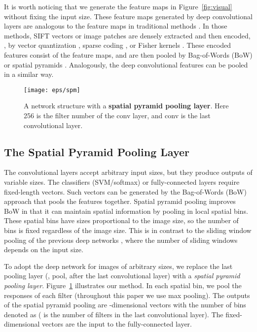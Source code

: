 \documentclass[10pt,journal,cspaper,compsoc]{IEEEtran}
\begin{document}
It is worth noticing that we generate the feature maps in Figure~\ref{fig:visual} without fixing the input size.
These feature maps generated by deep convolutional layers are analogous to the feature maps in traditional methods \cite{Chatfield2011,Coates2011}. In those methods, SIFT vectors \cite{Lowe2004} or image patches \cite{Coates2011} are densely extracted and then encoded, \eg, by vector quantization \cite{Sivic2003,Lazebnik2006,Gemert2008}, sparse coding \cite{Yang2009,Wang2010}, or Fisher kernels \cite{Perronnin2010}. These encoded features consist of the feature maps, and are then pooled by Bag-of-Words (BoW) \cite{Sivic2003} or spatial pyramids \cite{Grauman2005,Lazebnik2006}. Analogously, the deep convolutional features can be pooled in a similar way.

\begin{figure}[t]
\center
\texttt{[image: eps/spm]}
\caption{A network structure with a \textbf{spatial pyramid pooling layer}. Here 256 is the filter number of the conv layer, and conv is the last convolutional layer.}
\label{fig:spm}
\end{figure}

\subsection{The Spatial Pyramid Pooling Layer}

The convolutional layers accept arbitrary input sizes, but they produce outputs of variable sizes. The classifiers (SVM/softmax) or fully-connected layers require fixed-length vectors. Such vectors can be generated by the Bag-of-Words (BoW) approach \cite{Sivic2003} that pools the features together. Spatial pyramid pooling \cite{Grauman2005,Lazebnik2006} improves BoW in that it can maintain spatial information by pooling in local spatial bins. These spatial bins have sizes proportional to the image size, so the number of bins is fixed regardless of the image size. This is in contrast to the sliding window pooling of the previous deep networks \cite{Krizhevsky2012}, where the number of sliding windows depends on the input size.

To adopt the deep network for images of arbitrary sizes, we replace the last pooling layer (\eg, pool, after the last convolutional layer) with a \emph{spatial pyramid pooling layer}. Figure~\ref{fig:spm} illustrates our method. In each spatial bin, we pool the responses of each filter (throughout this paper we use max pooling). The outputs of the spatial pyramid pooling are -dimensional vectors with the number of bins denoted as  ( is the number of filters in the last convolutional layer). The fixed-dimensional vectors are the input to the fully-connected layer.
\end{document}
